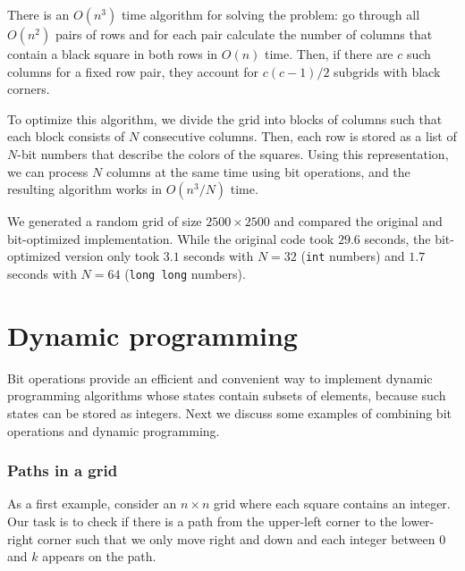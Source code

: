 There is an $O(n^3)$ time algorithm for solving the problem:
go through all $O(n^2)$ pairs of rows and for each pair
calculate the number of columns that contain a black
square in both rows in $O(n)$ time.
Then, if there are $c$ such columns for a fixed row pair,
they account for $c(c-1)/2$ subgrids with black corners.

To optimize this algorithm, we divide the grid into blocks
of columns such that each block consists of $N$
consecutive columns. Then, each row is stored as
a list of $N$-bit numbers that describe the colors
of the squares.
Using this representation,
we can process $N$ columns at the same time
using bit operations, and the resulting algorithm
works in $O(n^3/N)$ time.

We generated a random grid of size $2500 \times 2500$
and compared the original and bit-optimized implementation.
While the original code took $29.6$ seconds,
the bit-optimized version only took $3.1$ seconds
with $N=32$ (\texttt{int} numbers) and $1.7$ seconds
with $N=64$ (\texttt{long long} numbers).

\section{Dynamic programming}

Bit operations provide an efficient and convenient
way to implement dynamic programming algorithms
whose states contain subsets of elements,
because such states can be stored as integers.
Next we discuss some examples of combining
bit operations and dynamic programming.

\subsubsection{Paths in a grid}

As a first example, consider
an $n \times n$ grid where
each square contains an integer.
Our task is to check if there is a path from the upper-left
corner to the lower-right corner
such that we only move right and down
and each integer between 0 and $k$ appears on the path.

